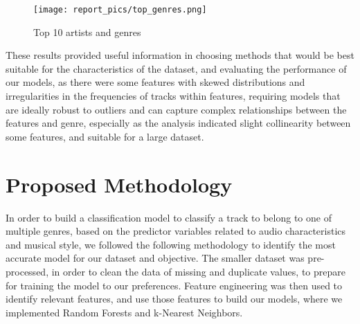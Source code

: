 \documentclass[times, twocolumn]{article}
\begin{document}
\begin{figure}[H]
    \centering
    \texttt{[image: report\_pics/top\_genres.png]}
    \caption{Top 10 artists and genres}
    \label{top10}
\end{figure}

These results provided useful information in choosing methods that would be best suitable for the characteristics of the dataset, and evaluating the performance of our models, as there were some features with skewed distributions and irregularities in the frequencies of tracks within features, requiring models that are ideally robust to outliers and can capture complex relationships between the features and genre, especially as the analysis indicated slight collinearity between some features, and suitable for a large dataset.

\section{Proposed Methodology}
In order to build a classification model to classify a track to belong to one of multiple genres, based on the predictor variables related to audio characteristics and musical style, we followed the following methodology to identify the most accurate model for our dataset and objective. The smaller dataset was pre-processed, in order to clean the data of missing and duplicate values, to prepare for training the model to our preferences. Feature engineering was then used to identify relevant features, and use those features to build our models, where we implemented Random Forests and k-Nearest Neighbors. \\
 
\end{document}
